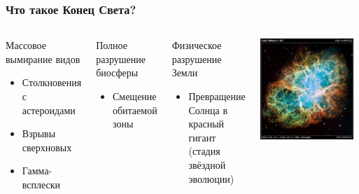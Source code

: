 \documentclass[aspectratio=169]{beamer}
\begin{document}
\begin{frame}
\frametitle{Что такое Конец Света?}
\begin{columns}[c]
\begin{block}{Массовое вымирание видов}
      \begin{itemize}
        \item Столкновения с астероидами
        \item Взрывы сверхновых
        \item Гамма-всплески
      \end{itemize}
\end{block}
\begin{block}{Полное разрушение биосферы}
      \begin{itemize}
      \item Смещение обитаемой зоны
      \end{itemize}
\end{block}
\begin{block}{Физическое разрушение Земли}
      \begin{itemize}
      \item Превращение Солнца в красный гигант (стадия звёздной эволюции)
      \end{itemize}
\end{block}
\includegraphics[width=0.95\textwidth]{img/crab_nebula_web_print.jpg}
\end{columns}
\end{frame}
\end{document}

